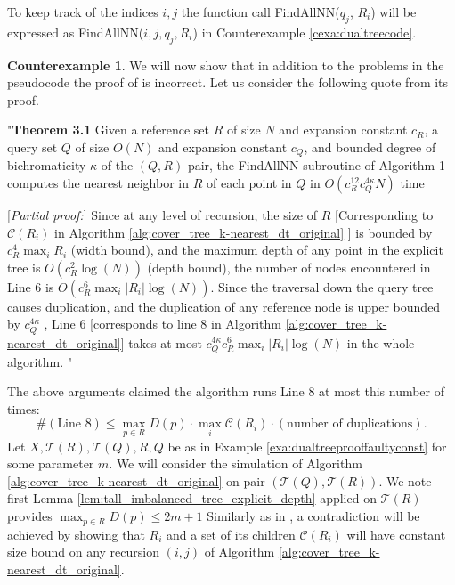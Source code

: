 \documentclass[a4paper,UKenglish,cleveref, autoref]{lipics-v2019}
\numberwithin{algocf}{section}
\theoremstyle{definition}
\theoremstyle{definition}
\theoremstyle{definition}
\newtheorem{cexa}[algocf]{Counterexample}
\theoremstyle{plain}
\newcommand{\C}{\mathcal{C}}
\newcommand{\T}{\mathcal{T}}
\begin{document}
To keep track of the indices $i,j$ the function call FindAllNN($q_j$, $R_i$) will be expressed as FindAllNN($i,j,q_j, R_i$) in Counterexample \ref{cexa:dualtreecode}.


\begin{cexa}
\label{cexa:dualtreeproof}
We will now show that in addition to the problems in the pseudocode the proof of \cite[Theorem~3.1]{ram2009linear} is incorrect.  Let us consider the following quote from its proof. 
\medskip

"\textbf{Theorem 3.1} Given a reference set $R$ of size $N$ and expansion constant $c_R$, a query set $Q$ of size
$O(N)$ and expansion constant $c_Q$, and bounded degree of bichromaticity $\kappa$ of the $(Q,R)$ pair, the
FindAllNN subroutine of Algorithm 1 computes the nearest neighbor in $R$ of each point in $Q$ in
$O(c^{12}_Rc^{4\kappa}_QN)$ time
\medskip

[\emph{Partial proof:}]
Since at any level of recursion, the size of $R$ [Corresponding to $\C(R_i)$ in Algorithm \ref{alg:cover_tree_k-nearest_dt_original} ] is bounded by $c_R^4\max_i{R_i}$ (width bound), and the
maximum depth of any point in the explicit tree is $O(c^2_R \log(N))$ (depth bound), the number of nodes
encountered in Line 6 is $O(c_R^{6} \max_i |R_i|\log(N))$. Since the traversal down the query tree causes
duplication, and the duplication of any reference node is upper bounded by $c_Q^{4\kappa}$ , Line 6 [corresponds to line 8 in Algorithm \ref{alg:cover_tree_k-nearest_dt_original}] takes at most
$c^{4\kappa}_Qc^6_R\max_i|R_i|\log(N)$ in the whole algorithm. 
"
\medskip

The above arguments claimed the algorithm runs Line 8 at most this number of times:
\begin{equation}
\label{eqa:AuthorClaimingDualTreeKNN}
\#(\text{Line 8}) \leq \max_{p \in R}D(p) \cdot \max_i \C(R_i)  \cdot (\text{number of duplications}).
\end{equation}
Let $X, \T(R), \T(Q), R, Q$ be as in Example \ref{exa:dualtreeprooffaultyconst} for some parameter $m$. We will consider the simulation of Algorithm \ref{alg:cover_tree_k-nearest_dt_original} on pair $(\T(Q),\T(R))$. We note first Lemma \ref{lem:tall_imbalanced_tree_explicit_depth} applied on $\T(R)$ provides $\max_{p \in R}D(p) \leq 2m+1$
Similarly as in \cite[Counterexample~3.7]{elkin2021new}, a contradiction will be achieved by showing that $R_i$ and a set of its children $\C(R_i)$ will have constant size bound on any recursion $(i,j)$ of Algorithm \ref{alg:cover_tree_k-nearest_dt_original}.
\medskip


\end{cexa}
\end{document}
